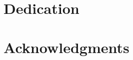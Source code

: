 \documentclass[12pt]{report}
\begin{document}
\chapter*{Dedication}
  \mydedication
\fi

\ifx\myacknowledgements\undefined
\else
  \chapter*{Acknowledgments}
  \myacknowledgements
\fi

\pagebreak


\tableofcontents

\pagebreak


\listoffigures

\pagebreak


\listoftables

\pagebreak


\pagestyle{myheadings}

\ifx\mylinespace\undefined
\else
  \mylinespace
\fi

\emergencystretch=10pt
\newcommand{\V}[1]{\boldsymbol{\mathbf{#1}}}
\newcommand{\vect}[1]{\boldsymbol{\mathbf{#1}}}
\newcommand{\arraybegin}[1]{\begin{IEEEeqnarraybox*}[][c]{#1}}
\newcommand{\arrayend}{\end{IEEEeqnarraybox*}}
\newcommand{\unaryminus}{\scalebox{0.75}[1.0]{\( - \)}}
\newcommand{\ubar}[1]{\underaccent{\bar}{#1}}
\end{document}
